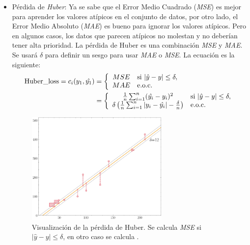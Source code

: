 \begin{itemize}
\item Pérdida de \textit{Huber}\cite{huber_loss}\label{huber_loss}: Ya se sabe que el Error Medio Cuadrado (\textit{MSE}) es mejor para aprender los valores atípicos en el conjunto de datos, por otro lado, el Error Medio Absoluto (\textit{MAE}) es bueno para ignorar los valores atípicos. Pero en algunos casos, los datos que parecen atípicos no molestan y no deberían tener alta prioridad. La pérdida de Huber es una combinación \textit{MSE} y \textit{MAE}. Se usará $\delta$ para definir un sesgo para usar \textit{MAE} o \textit{MSE}. La ecuación es la siguiente:
\begin{equation}
\centering
    \begin{split}
    \text{Huber\_loss} = c_i(y_1, \hat{y_1}) &= \left\{ 
        \begin{array}{cl} 
            MSE & \text{si }|\hat{y}-y| \le \delta, \\
            MAE & \text{e.o.c.}
        \end{array}\right. \\ &= \left\{ 
        \begin{array}{cl} 
            \frac{1}{n} \sum_{i=1}^n (\hat{y_i} - y_i)^2 & \text{si }|\hat{y}-y| \le \delta, \\
            \delta \left(\frac{1}{n} \sum_{i=1}^n |y_i - \hat{y_i}|-\frac{\delta}{n}\right) & \text{e.o.c.}
        \end{array}\right.
    \end{split}
\end{equation}

\begin{figure}[H]
    \centering
    \includegraphics[width=7cm]{images/state-of-art/cost-function/huber.png}
    \caption{Visualización de la pérdida de Huber. Se calcula \textit{MSE} si $|\hat{y}-y| \le \delta$, en otro caso se calcula .}
    \label{fig:error_mae}
\end{figure}



\end{itemize}
